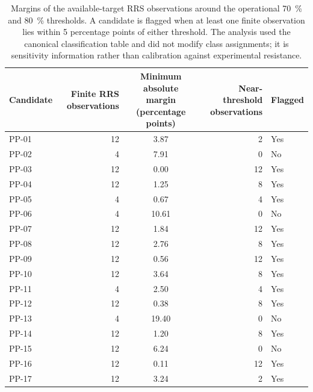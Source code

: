 \begin{table}[htbp]
\centering
\scriptsize
\caption{Margins of the available-target RRS observations around the operational \qty{70}{\percent} and \qty{80}{\percent} thresholds. A candidate is flagged when at least one finite observation lies within 5 percentage points of either threshold. The analysis used the canonical classification table and did not modify class assignments; it is sensitivity information rather than calibration against experimental resistance.}
\label{tab:s18_rrs_margin_sensitivity}
\begin{tabularx}{\textwidth}{l r S[table-format=2.2] r l}
\toprule
Candidate & {Finite RRS observations} & {Minimum absolute margin (percentage points)} & {Near-threshold observations} & {Flagged} \\
\midrule
PP-01 & 12 & 3.87 & 2 & Yes \\
PP-02 & 4 & 7.91 & 0 & No \\
PP-03 & 12 & 0.00 & 12 & Yes \\
PP-04 & 12 & 1.25 & 8 & Yes \\
PP-05 & 4 & 0.67 & 4 & Yes \\
PP-06 & 4 & 10.61 & 0 & No \\
PP-07 & 12 & 1.84 & 12 & Yes \\
PP-08 & 12 & 2.76 & 8 & Yes \\
PP-09 & 12 & 0.56 & 12 & Yes \\
PP-10 & 12 & 3.64 & 8 & Yes \\
PP-11 & 4 & 2.50 & 4 & Yes \\
PP-12 & 12 & 0.38 & 8 & Yes \\
PP-13 & 4 & 19.40 & 0 & No \\
PP-14 & 12 & 1.20 & 8 & Yes \\
PP-15 & 12 & 6.24 & 0 & No \\
PP-16 & 12 & 0.11 & 12 & Yes \\
PP-17 & 12 & 3.24 & 2 & Yes \\
\bottomrule
\end{tabularx}
\end{table}
